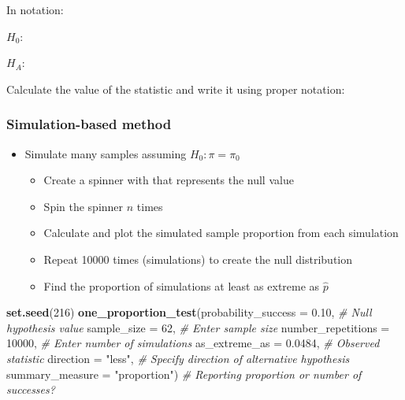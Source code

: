 \documentclass[
]{report}
\newenvironment{Shaded}{\begin{snugshade}}{\end{snugshade}}
\newcommand{\AttributeTok}[1]{\textcolor[rgb]{0.13,0.29,0.53}{#1}}
\newcommand{\CommentTok}[1]{\textcolor[rgb]{0.56,0.35,0.01}{\textit{#1}}}
\newcommand{\DecValTok}[1]{\textcolor[rgb]{0.00,0.00,0.81}{#1}}
\newcommand{\FloatTok}[1]{\textcolor[rgb]{0.00,0.00,0.81}{#1}}
\newcommand{\FunctionTok}[1]{\textcolor[rgb]{0.13,0.29,0.53}{\textbf{#1}}}
\newcommand{\NormalTok}[1]{#1}
\newcommand{\StringTok}[1]{\textcolor[rgb]{0.31,0.60,0.02}{#1}}
\newcommand{\rgi}{\hspace{24pt}}  %
\begin{document}
\rgi In notation:

\vspace{1mm}

\rgi \rgi \(H_0:\)

\vspace{0.2in}

\rgi \rgi \(H_A:\)

\vspace{0.2in}

Calculate the value of the statistic and write it using proper notation:

\vspace{0.2in}

\subsubsection*{Simulation-based method}\label{simulation-based-method-1}

\begin{itemize}
\item
  Simulate many samples assuming \(H_0: \pi = \pi_0\)

  \begin{itemize}
  \item
    Create a spinner with that represents the null value
  \item
    Spin the spinner \(n\) times
  \item
    Calculate and plot the simulated sample proportion from each simulation
  \item
    Repeat 10000 times (simulations) to create the null distribution
  \item
    Find the proportion of simulations at least as extreme as \(\hat{p}\)
  \end{itemize}
\end{itemize}

\begin{Shaded}
\begin{Highlighting}[]
\FunctionTok{set.seed}\NormalTok{(}\DecValTok{216}\NormalTok{)}
\FunctionTok{one\_proportion\_test}\NormalTok{(}\AttributeTok{probability\_success =} \FloatTok{0.10}\NormalTok{, }\CommentTok{\# Null hypothesis value}
          \AttributeTok{sample\_size =} \DecValTok{62}\NormalTok{, }\CommentTok{\# Enter sample size}
          \AttributeTok{number\_repetitions =} \DecValTok{10000}\NormalTok{, }\CommentTok{\# Enter number of simulations}
          \AttributeTok{as\_extreme\_as =} \FloatTok{0.0484}\NormalTok{, }\CommentTok{\# Observed statistic}
          \AttributeTok{direction =} \StringTok{"less"}\NormalTok{, }\CommentTok{\# Specify direction of alternative hypothesis}
          \AttributeTok{summary\_measure =} \StringTok{"proportion"}\NormalTok{) }\CommentTok{\# Reporting proportion or number of successes?}
\end{Highlighting}
\end{Shaded}
\end{document}
